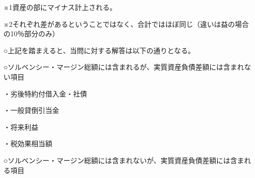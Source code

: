 \documentclass[report,gutter=10mm,fore-edge=10mm,uplatex,dvipdfmx]{jlreq}
\begin{document}

※1資産の部にマイナス計上される。

※2それぞれ差があるということではなく、合計ではほぼ同じ（違いは益の場合の10％部分のみ）


○上記を踏まえると、当問に対する解答は以下の通りとなる。

○ソルベンシー・マージン総額には含まれるが、実質資産負債差額には含まれない項目

・劣後特約付借入金・社債

・一般貸倒引当金

・将来利益

・税効果相当額

○ソルベンシー・マージン総額には含まれないが、実質資産負債差額には含まれる項目
\end{document}
